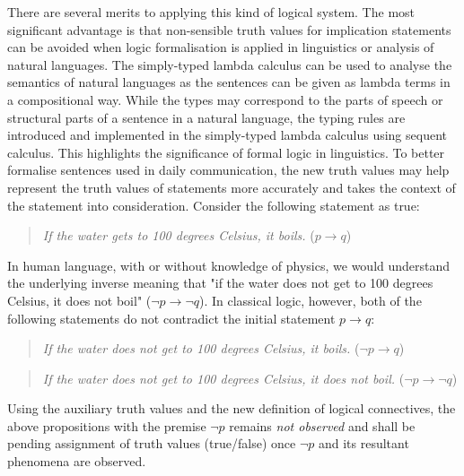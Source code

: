 \documentclass{article}
\begin{document}
There are several merits to applying this kind of logical system. The most significant advantage is that non-sensible truth values for implication statements can be avoided when logic formalisation is applied in linguistics or analysis of natural languages. The simply-typed lambda calculus{\cite{Lambda}} can be used to analyse the semantics of natural languages as the sentences can be given as lambda terms in a compositional way. While the types may correspond to the parts of speech or structural parts of a sentence in a natural language, the typing rules are introduced and implemented in the simply-typed lambda calculus using sequent calculus. This highlights the significance of formal logic in linguistics. To better formalise sentences used in daily communication, the new truth values may help represent the truth values of statements more accurately and takes the context of the statement into consideration. Consider the following statement as true:

\begin{quote}
    \textit{If the water gets to 100 degrees Celsius, it boils.} ($p \to q$)
\end{quote}

In human language, with or without knowledge of physics, we would understand the underlying inverse meaning that "if the water does not get to 100 degrees Celsius, it does not boil" ($\neg p \to \neg q$). In classical logic, however, both of the following statements do not contradict the initial statement $p \to q$:

\begin{quote}
    \textit{If the water does not get to 100 degrees Celsius, it boils.} ($\neg p \to q$)
\end{quote}

\begin{quote}
    \textit{If the water does not get to 100 degrees Celsius, it does not boil.} ($\neg p \to \neg q$)
\end{quote}

Using the auxiliary truth values and the new definition of logical connectives, the above propositions with the premise $\neg p$ remains \textit{not observed} and shall be pending assignment of truth values (true/false) once $\neg p$ and its resultant phenomena are observed.

\bigskip
\end{document}
